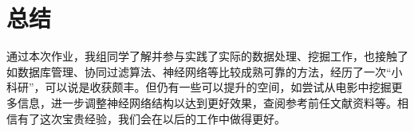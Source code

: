 \documentclass[UTF8]{ctexart}
\begin{document}
\section{总结}
\par 通过本次作业，我组同学了解并参与实践了实际的数据处理、挖掘工作，也接触了如数据库管理、协同过滤算法、神经网络等比较成熟可靠的方法，经历了一次“小科研”，可以说是收获颇丰。但仍有一些可以提升的空间，如尝试从电影中挖掘更多信息，进一步调整神经网络结构以达到更好效果，查阅参考前任文献资料等。相信有了这次宝贵经验，我们会在以后的工作中做得更好。
\end{document}
